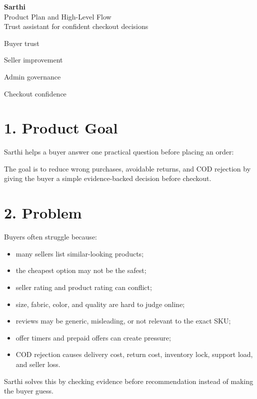 \documentclass[11pt,a4paper,landscape]{article}
\newcommand{\pill}[1]{\colorbox{sarthiSoft}{\strut\hspace{0.45em}#1\hspace{0.45em}}}
\begin{document}
\begin{center}
{\Huge\bfseries\color{sarthiGreen} Sarthi}\\[0.35em]
{\Large Product Plan and High-Level Flow}\\[0.7em]
{\large Trust assistant for confident checkout decisions}\\[1.1em]
\pill{Buyer trust} \quad \pill{Seller improvement} \quad \pill{Admin governance} \quad \pill{Checkout confidence}
\end{center}

\vspace{0.8em}

\section{1. Product Goal}
Sarthi helps a buyer answer one practical question before placing an order:

\begin{center}
\end{center}

The goal is to reduce wrong purchases, avoidable returns, and COD rejection by giving the buyer a simple evidence-backed decision before checkout.

\section{2. Problem}
Buyers often struggle because:
\begin{itemize}
  \item many sellers list similar-looking products;
  \item the cheapest option may not be the safest;
  \item seller rating and product rating can conflict;
  \item size, fabric, color, and quality are hard to judge online;
  \item reviews may be generic, misleading, or not relevant to the exact SKU;
  \item offer timers and prepaid offers can create pressure;
  \item COD rejection causes delivery cost, return cost, inventory lock, support load, and seller loss.
\end{itemize}

Sarthi solves this by checking evidence before recommendation instead of making the buyer guess.
\end{document}
